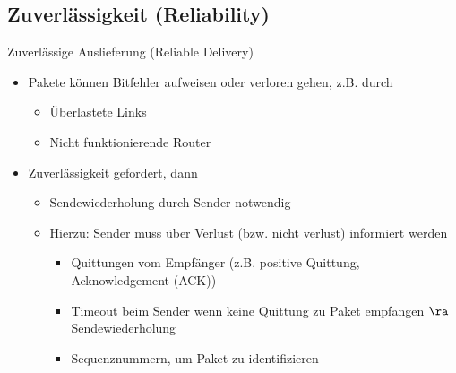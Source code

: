   \subsection{Zuverlässigkeit (Reliability)}
    Zuverlässige Auslieferung (Reliable Delivery)
    \begin{itemize}
      \item Pakete können Bitfehler aufweisen oder verloren gehen, z.B. durch
        \begin{itemize}
          \item Überlastete Links
          \item Nicht funktionierende Router
        \end{itemize}
      \item Zuverlässigkeit gefordert, dann
        \begin{itemize}
          \item Sendewiederholung durch Sender notwendig
          \item Hierzu: Sender muss über Verlust (bzw. nicht verlust) informiert werden
            \begin{itemize}
              \item Quittungen vom Empfänger (z.B. positive Quittung, Acknowledgement (ACK))
              \item Timeout beim Sender wenn keine Quittung zu Paket empfangen $\ra$ Sendewiederholung
              \item Sequenznummern, um Paket zu identifizieren
            \end{itemize}
        \end{itemize}
    \end{itemize}
